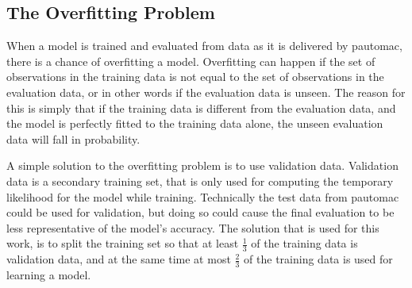 \subsection{The Overfitting Problem}
When a model is trained and evaluated from data as it is delivered by pautomac, there is a chance of overfitting a model. Overfitting can happen if the set of observations in the training data is not equal to the set of observations in the evaluation data, or in other words if the evaluation data is unseen. The reason for this is simply that if the training data is different from the evaluation data, and the model is perfectly fitted to the training data alone, the unseen evaluation data will fall in probability.

A simple solution to the overfitting problem is to use validation data. Validation data is a secondary training set, that is only used for computing the temporary likelihood for the model while training. Technically the test data from pautomac could be used for validation, but doing so could cause the final evaluation to be less representative of the model's accuracy. The solution that is used for this work, is to split the training set so that at least $\frac{1}{3}$ of the training data is validation data, and at the same time at most $\frac{2}{3}$ of the training data is used for learning a model.